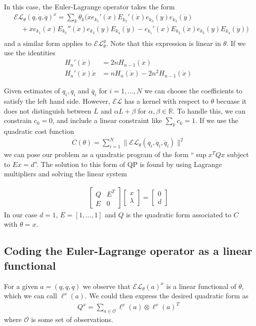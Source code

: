 \documentclass[12pt]{amsart}
\begin{document}
In this case, the Euler-Lagrange operator takes the form
\begin{align*}
	&\mathcal{EL}_\theta (q,\dot{q},\ddot{q})^x = \sum_k \theta_k \big( \dot{x} e_{k_1}'(x) E_{k_2}'(\dot{x}) e_{k_3}(y) e_{k_4}(\dot{y}) \\
	&\quad + \ddot{x} e_{k_1}(x) E_{k_2}''(\dot{x}) e_{k_3}(y) E_{k_4}(\dot{y}) - e_{k_1}'(x) E_{k_2}(\dot{x}) e_{k_3}(y) E_{k_4}(\dot{y}) \big)  \\
\end{align*}
and a similar form applies to $\mathcal{EL}_\theta^y$.
Note that this expression is linear in $\theta$.
If we use the identities
\begin{align*}
	H_n'(\dot{x}) &= 2n H_{n-1}(\dot{x}) \\
	H_n'(\dot{x}) \dot{x} &= n H_n(\dot{x}) - 2n^2 H_{n-1}(\dot{x})
\end{align*}

Given estimates of $q_i, \dot{q}_i$ and $\ddot{q}_i$ for $i=1,\dots, N$ we can choose the coefficients to satisfy the left hand side.
However, $\mathcal{EL}$ has a kernel with respect to $\theta$ becuase
it does not distinguish between $L$ and $\alpha L + \beta$ for $\alpha,\beta \in \mathbb{R}$.
To handle this, we can constrain $c_0 = 0$, and include a linear constraint like $\sum_k c_k = 1$.
If we use the quadratic cost function
\begin{align*}
	C( \theta ) = \sum_{i=1}^{N} \| \mathcal{EL}_\theta( q_i ,\dot{q}_i ,\ddot{q}_i  ) \|^2
\end{align*}
we can pose our problem as a quadratic program of the form ``$\sup x^T Q x$ subject to $Ex = d$''.
The solution to this form of QP is found by using Lagrange multipliers and solving the linear system

\begin{align*}
	\begin{bmatrix}
		Q & E^T \\
		E & 0 
	\end{bmatrix}
	\begin{bmatrix}
		x \\
		\lambda
	\end{bmatrix}
	=
	\begin{bmatrix}
		0 \\
		d
	\end{bmatrix}
\end{align*}
In our case $d=1$, $E = [1,\dots,1]$ and $Q$ is the quadratic form associated to $C$ with $\theta = x$.

\subsection{Coding the Euler-Lagrange operator as a linear functional}
For a given $a=(q,\dot{q},\ddot{q})$ we observe that $\mathcal{EL}_\theta(a)^x$ is a linear functional of $\theta$, which we can call $\ell^x(a)$.
We could then express the desired quadratic form as
\begin{align*}
Q^x = \sum_{a \in \mathcal{O}} \ell^x(a) \otimes \ell^x(a)^T
\end{align*}
where $\mathcal{O}$ is some set of observations.
\end{document}
